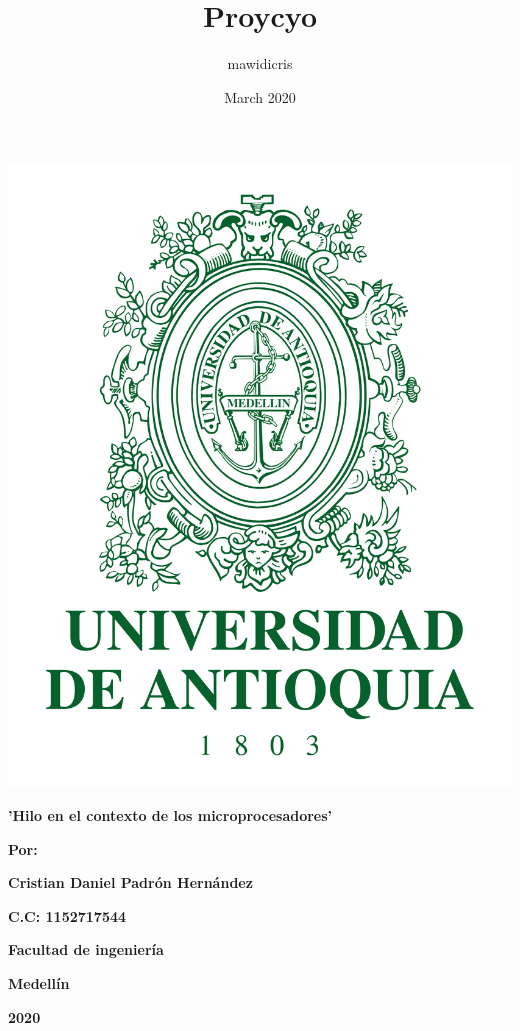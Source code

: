 \documentclass{article}
\title{Proycyo}
\author{mawidicris }
\date{March 2020}
\begin{document}
\begin{center}
\includegraphics[scale=0.090]{Escudo-UdeA.svg.png}
\end{center}
\vspace{50pt}
\begin{center}
\bf{\sc\Large 'Hilo en el contexto de los microprocesadores'}\\
\end{center}
\vspace{50pt}
\begin{center}
\begin{center}
\bf{\sc\large Por:}\\
\end{center}
\bf{\sc\large Cristian Daniel Padrón Hernández}\\
\end{center}
\begin{center}

\bf{\sc\large C.C: 1152717544}\\
\end{center}
\vspace{50pt}
\begin{center}
\bf{\sc\large Facultad de ingeniería}\\
\end{center}
\begin{center}
\bf{\sc\large Medellín}
\end{center}
\begin{center}
\bf{\sc\large 2020}\\
\end{center}\
\end{document}
